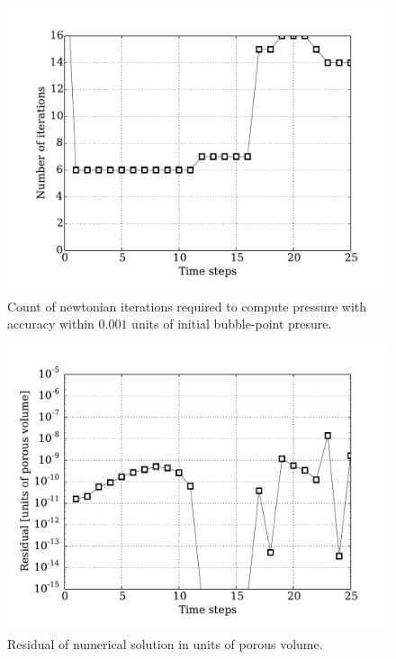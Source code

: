 \documentclass[final,authoryear,5p,twocolumn,10pt]{elsarticle}
\begin{document}
\begin{figure}
\centering
\includegraphics[width=\linewidth]{./python/matbal_iter}
\caption{Count of newtonian iterations required to compute pressure with accuracy within $0.001$ units of initial bubble-point presure.}
\label{fig: iter}
\end{figure}

\begin{figure}
\centering
\includegraphics[width=\linewidth]{./python/matbal_residual}
\caption{Residual of numerical solution in units of porous volume.}
\label{fig: residual}
\end{figure}
\end{document}
